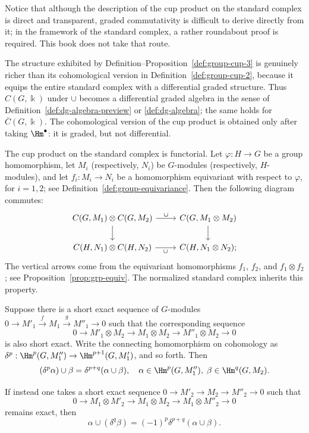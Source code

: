 Notice that although the description of the cup product on the standard
complex is direct and transparent, graded commutativity is difficult to
derive directly from it; in the framework of the standard complex, a rather
roundabout proof is required. This book does not take that route.

\begin{remark}
	The structure exhibited by
	Definition--Proposition~\ref{def:group-cup-3} is genuinely richer than its
	cohomological version in Definition~\ref{def:group-cup-2}, because it
	equips the entire standard complex with a differential graded structure.
	Thus $C(G,\Bbbk)$ under $\cup$ becomes a differential graded algebra in
	the sense of Definition~\ref{def:dg-algebra-preview} or
	\ref{def:dg-algebra}; the same holds for $\overline{C}(G,\Bbbk)$. The
	cohomological version of the cup product is obtained only after taking
	$\Hm^\bullet$: it is graded, but not differential.
\end{remark}

The cup product on the standard complex is functorial. Let
$\varphi:H\to G$ be a group homomorphism, let $M_i$ (respectively, $N_i$)
be $G$-modules (respectively, $H$-modules), and let $f_i:M_i\to N_i$ be a
homomorphism equivariant with respect to $\varphi$, for $i=1,2$; see
Definition~\ref{def:group-equivariance}. Then the following diagram commutes:
\[\begin{tikzcd}
	C(G, M_1) \otimes C(G, M_2) \arrow[r, "\cup"] \arrow[d] & C(G, M_1 \otimes M_2) \arrow[d] \\
	C(H, N_1) \otimes C(H, N_2) \arrow[r, "\cup"'] & C(H, N_1 \otimes N_2);
\end{tikzcd}\]
The vertical arrows come from the equivariant homomorphisms $f_1$, $f_2$,
and $f_1\otimes f_2$; see Proposition~\ref{prop:grp-equiv}. The normalized
standard complex inherits this property.

\begin{corollary}\label{prop:cup-ses}
	Suppose there is a short exact sequence of $G$-modules
	$0\to M'_1\xrightarrow{f}M_1\xrightarrow{g}M''_1\to0$ such that the
	corresponding sequence
	\[ 0 \to M'_1 \otimes M_2 \to M_1 \otimes M_2 \to M''_1 \otimes M_2 \to 0 \]
	is also short exact. Write the connecting homomorphism on cohomology as
	$\delta^p:\Hm^p(G,M''_1)\to\Hm^{p+1}(G,M'_1)$, and so forth. Then
	\[ (\delta^p \alpha) \cup \beta = \delta^{p+q}(\alpha \cup \beta), \quad \alpha \in \Hm^p(G, M''_1), \; \beta \in \Hm^q(G, M_2). \]

	If instead one takes a short exact sequence
	$0\to M'_2\to M_2\to M''_2\to0$ such that
	\[ 0 \to M_1 \otimes M'_2 \to M_1 \otimes M_2 \to M_1 \otimes M''_2 \to 0 \]
	remains exact, then
	\[ \alpha \cup (\delta^q \beta) = (-1)^p \delta^{p+q} (\alpha \cup \beta). \]
\end{corollary}

